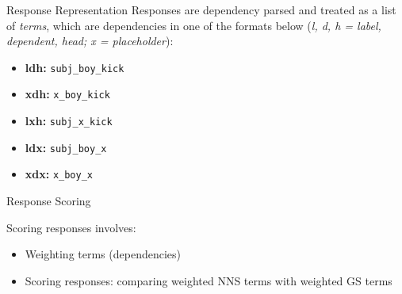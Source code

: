 \documentclass[final,t]{beamer}
\begin{document}
\begin{frame}{}
\begin{columns}[t]
\begin{column}{.64\linewidth}
\begin{columns}
\begin{column}{.48\linewidth}
\begin{block}{Response Representation}
Responses are dependency parsed and treated as a list of \textit{terms}, which are dependencies in one of the formats below (\textit{l, d, h = label, dependent, head; x = placeholder}):
\begin{center}
\begin{minipage}{.33\textwidth}
  \begin{mdframed}[innertopmargin=15pt,innerbottommargin=15pt,roundcorner=10pt]
  \begin{center}
  \begin{minipage}{.8\textwidth}
    \begin{itemize}
    \item{\textbf{ldh:} \texttt{subj\_boy\_kick}}
    \item{\textbf{xdh:} \texttt{x\_boy\_kick}}
    \item{\textbf{lxh:} \texttt{subj\_x\_kick}}
    \item{\textbf{ldx:} \texttt{subj\_boy\_x}}
    \item{\textbf{xdx:} \texttt{x\_boy\_x}}
    \end{itemize}
  \end{minipage}
  \end{center}
  \end{mdframed}
\end{minipage}
\end{center}

\vspace{-.5em}
\end{block} 


\begin{block}{Response Scoring}

Scoring responses involves: 
\begin{center}
  \begin{minipage}{.85\textwidth}
    \begin{itemize}
    \item Weighting terms (dependencies) 
    \item Scoring responses: comparing weighted NNS terms with
      weighted GS terms
    \end{itemize}
  \end{minipage}
\end{center}


\end{block}
\end{column}
\end{columns}
\end{column}
\end{columns}
\end{frame}
\end{document}
